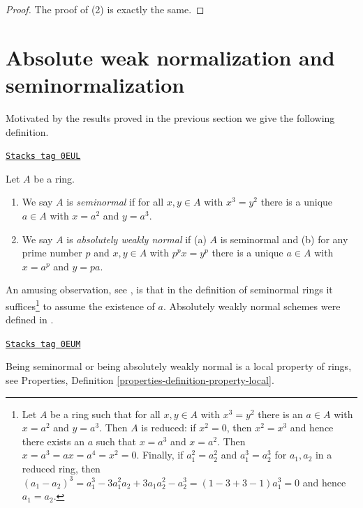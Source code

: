 \begin{proof}
\medskip\noindent
The proof of (2) is exactly the same.
\end{proof}

\section{Absolute weak normalization and seminormalization}
\label{morphisms-section-seminormalization}
Motivated by the results proved in the previous section
we give the following definition.

\begin{definition}
\label{morphisms-definition-seminormal-ring}
\href{https://stacks.math.columbia.edu/tag/0EUL}{\texttt{Stacks tag 0EUL}}

Let $A$ be a ring.
\begin{enumerate}
\item We say $A$ is {\it seminormal} if for all $x, y \in A$
with $x^3 = y^2$ there is a unique $a \in A$ with
$x = a^2$ and $y = a^3$.
\item We say $A$ is {\it absolutely weakly normal} if
(a) $A$ is seminormal and
(b) for any prime number $p$ and $x, y \in A$ with $p^px = y^p$
there is a unique $a \in A$ with $x = a^p$ and $y = pa$.
\end{enumerate}
\end{definition}

An amusing observation, see \cite{Costa},
is that in the definition of seminormal rings it suffices\footnote{Let
$A$ be a ring such that for all $x, y \in A$ with $x^3 = y^2$ there is
an $a \in A$ with $x = a^2$ and $y = a^3$. Then $A$ is reduced: if
$x^2 = 0$, then $x^2 = x^3$ and hence there exists an $a$ such that
$x = a^3$ and $x = a^2$. Then $x = a^3 = ax = a^4 = x^2 = 0$. Finally,
if $a_1^2 = a_2^2$ and $a_1^3 = a_2^3$ for $a_1, a_2$ in a reduced ring,
then $(a_1 - a_2)^3 = a_1^3 - 3a_1^2a_2 +3a_1a_2^2 - a_2^3 =
(1 - 3 + 3 - 1)a_1^3 = 0$ and hence $a_1 = a_2$.} to assume the existence
of $a$. Absolutely weakly normal schemes were defined in
\cite[Appendix B]{rydh_descent}.

\begin{lemma}
\label{morphisms-lemma-seminormal-local-property}
\href{https://stacks.math.columbia.edu/tag/0EUM}{\texttt{Stacks tag 0EUM}}

Being seminormal or being absolutely weakly normal
is a local property of rings, see
Properties, Definition \ref{properties-definition-property-local}.
\end{lemma}

